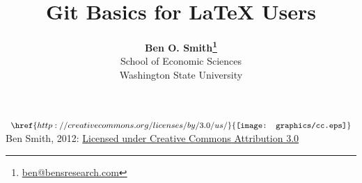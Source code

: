 \documentclass[11pt]{article}
\begin{document}
 

\title{Git Basics for LaTeX Users}
\date{}
\author{\textbf{Ben O. Smith\footnote{\href{mailto:ben@bensresearch.com}{ben@bensresearch.com}}} \\
School of Economic Sciences \\
Washington State University}
\maketitle \doublespace







\vspace{\fill}
\noindent $ \begin{array}{l} \href{http://creativecommons.org/licenses/by/3.0/us/}{\texttt{[image: graphics/cc.eps]}} \end{array} $ Ben Smith, 2012: \href{http://creativecommons.org/licenses/by/3.0/us/}{Licensed under Creative Commons Attribution 3.0}
\end{document}

